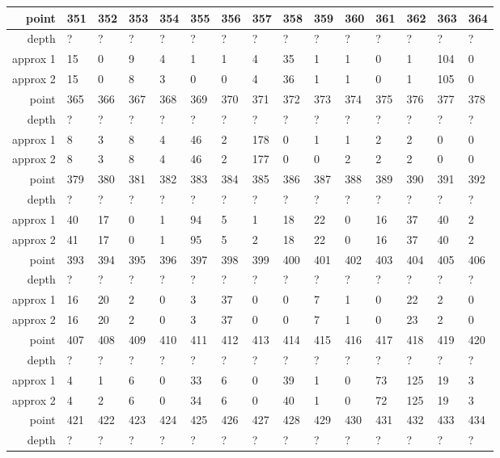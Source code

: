 \begin{center}
\begin{supertabular}{|r|l l l l l l l l l l l l l l|}
\hline
point & 351 & 352 & 353 & 354 & 355 & 356 & 357 & 358 & 359 & 360 & 361 & 362 & 363 & 364 \\
\hline
depth & ? & ? & ? & ? & ? & ? & ? & ? & ? & ? & ? & ? & ? & ? \\
approx 1 & 15 & 0 & 9 & 4 & 1 & 1 & 4 & 35 & 1 & 1 & 0 & 1 & 104 & 0 \\
approx 2 & 15 & 0 & 8 & 3 & 0 & 0 & 4 & 36 & 1 & 1 & 0 & 1 & 105 & 0 \\
\hline
point & 365 & 366 & 367 & 368 & 369 & 370 & 371 & 372 & 373 & 374 & 375 & 376 & 377 & 378 \\
\hline
depth & ? & ? & ? & ? & ? & ? & ? & ? & ? & ? & ? & ? & ? & ? \\
approx 1 & 8 & 3 & 8 & 4 & 46 & 2 & 178 & 0 & 1 & 1 & 2 & 2 & 0 & 0 \\
approx 2 & 8 & 3 & 8 & 4 & 46 & 2 & 177 & 0 & 0 & 2 & 2 & 2 & 0 & 0 \\
\hline
point & 379 & 380 & 381 & 382 & 383 & 384 & 385 & 386 & 387 & 388 & 389 & 390 & 391 & 392 \\
\hline
depth & ? & ? & ? & ? & ? & ? & ? & ? & ? & ? & ? & ? & ? & ? \\
approx 1 & 40 & 17 & 0 & 1 & 94 & 5 & 1 & 18 & 22 & 0 & 16 & 37 & 40 & 2 \\
approx 2 & 41 & 17 & 0 & 1 & 95 & 5 & 2 & 18 & 22 & 0 & 16 & 37 & 40 & 2 \\
\hline
point & 393 & 394 & 395 & 396 & 397 & 398 & 399 & 400 & 401 & 402 & 403 & 404 & 405 & 406 \\
\hline
depth & ? & ? & ? & ? & ? & ? & ? & ? & ? & ? & ? & ? & ? & ? \\
approx 1 & 16 & 20 & 2 & 0 & 3 & 37 & 0 & 0 & 7 & 1 & 0 & 22 & 2 & 0 \\
approx 2 & 16 & 20 & 2 & 0 & 3 & 37 & 0 & 0 & 7 & 1 & 0 & 23 & 2 & 0 \\
\hline
point & 407 & 408 & 409 & 410 & 411 & 412 & 413 & 414 & 415 & 416 & 417 & 418 & 419 & 420 \\
\hline
depth & ? & ? & ? & ? & ? & ? & ? & ? & ? & ? & ? & ? & ? & ? \\
approx 1 & 4 & 1 & 6 & 0 & 33 & 6 & 0 & 39 & 1 & 0 & 73 & 125 & 19 & 3 \\
approx 2 & 4 & 2 & 6 & 0 & 34 & 6 & 0 & 40 & 1 & 0 & 72 & 125 & 19 & 3 \\
\hline
point & 421 & 422 & 423 & 424 & 425 & 426 & 427 & 428 & 429 & 430 & 431 & 432 & 433 & 434 \\
\hline
depth & ? & ? & ? & ? & ? & ? & ? & ? & ? & ? & ? & ? & ? & ? \\

\end{supertabular}
\end{center}
